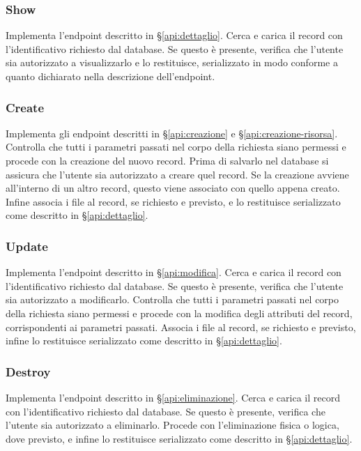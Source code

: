 \subsubsection{Show}
Implementa l'endpoint descritto in \S \ref{api:dettaglio}. Cerca e carica il record con l'identificativo richiesto dal database. Se questo è presente, verifica che l'utente sia autorizzato a visualizzarlo e lo restituisce, serializzato in modo conforme a quanto dichiarato nella descrizione dell'endpoint.

\subsubsection{Create}
Implementa gli endpoint descritti in \S \ref{api:creazione} e \S \ref{api:creazione-risorsa}. Controlla che tutti i parametri passati nel corpo della richiesta siano permessi e procede con la creazione del nuovo record. Prima di salvarlo nel database si assicura che l'utente sia autorizzato a creare quel record. Se la creazione avviene all'interno di un altro record, questo viene associato con quello appena creato. Infine associa i file al record, se richiesto e previsto, e lo restituisce serializzato come descritto in \S \ref{api:dettaglio}.

\subsubsection{Update}
Implementa l'endpoint descritto in \S \ref{api:modifica}. Cerca e carica il record con l'identificativo richiesto dal database. Se questo è presente, verifica che l'utente sia autorizzato a modificarlo. Controlla che tutti i parametri passati nel corpo della richiesta siano permessi e procede con la modifica degli attributi del record, corrispondenti ai parametri passati. Associa i file al record, se richiesto e previsto, infine lo restituisce serializzato come descritto in \S \ref{api:dettaglio}.

\subsubsection{Destroy}
Implementa l'endpoint descritto in \S \ref{api:eliminazione}. Cerca e carica il record con l'identificativo richiesto dal database. Se questo è presente, verifica che l'utente sia autorizzato a eliminarlo. Procede con l'eliminazione fisica o logica, dove previsto, e infine lo restituisce serializzato come descritto in \S \ref{api:dettaglio}.

